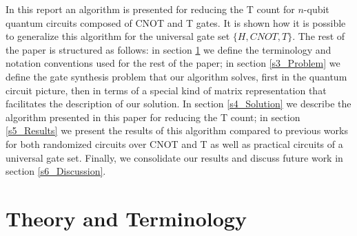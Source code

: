 \documentclass{article}
\theoremstyle{definition}
\theoremstyle{problem}
\theoremstyle{lemma}
\begin{document}
	In this report an algorithm is presented for reducing the T count for $n$-qubit quantum circuits composed of CNOT and T gates. It is shown how it is possible to generalize this algorithm for the universal gate set $\{H, CNOT, T\}$. The rest of the paper is structured as follows: in section \ref{s2_Theory} we define the terminology and notation conventions used for the rest of the paper; in section \ref{s3_Problem} we define the gate synthesis problem that our algorithm solves, first in the quantum circuit picture, then in terms of a special kind of matrix representation that facilitates the description of our solution. In section \ref{s4_Solution} we describe the algorithm presented in this paper for reducing the T count; in section \ref{s5_Results} we present the results of this algorithm compared to previous works for both randomized circuits over CNOT and T as well as practical circuits of a universal gate set. Finally, we consolidate our results and discuss future work in section \ref{s6_Discussion}.
	
	\FloatBarrier
	\section{Theory and Terminology}
	\label{s2_Theory}
\end{document}
